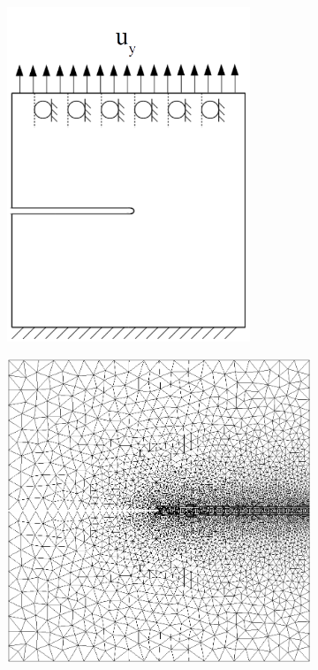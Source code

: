 \begin{figure}[htb!]
  \centering
  \begin{subfigure}[b]{0.25\textwidth}
    \centering
    \includegraphics[width=0.8\textwidth,scale=0.5]{Chapter4/figures/mode1_bcs}
    \caption{}
    \label{fig: Chapter4/mode1_bcs}
  \end{subfigure}
  \hspace{0.03\textwidth}
  \begin{subfigure}[b]{0.19\textwidth}
    \centering
    \includegraphics[width=\textwidth]{Chapter4/figures/mode1_notch_mesh.png}

\end{subfigure}
\end{figure}
